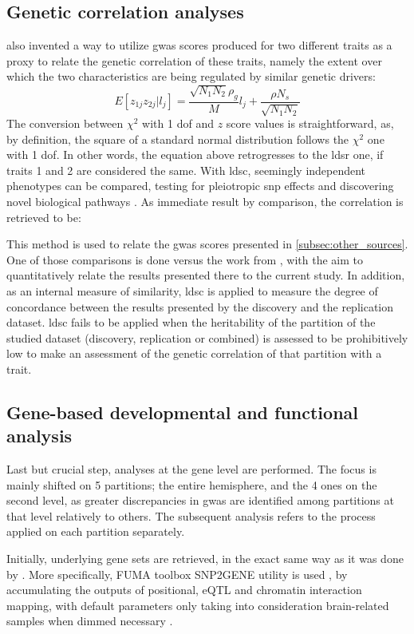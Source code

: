 \subsection{Genetic correlation analyses}
\label{subsec:ldsc}
\citet{Bulik-Sullivan2015_cor} also invented a way to utilize \ac{gwas} scores produced for two different traits as a proxy to relate the genetic correlation of these traits, namely the extent over which the two characteristics are being regulated by similar genetic drivers:
$$
E[z_{1j}z_{2j}|l_j] = \frac{\sqrt{N_1N_2}\rho_g}{M}l_j + \frac{\rho N_s}{\sqrt{N_1N_2}}
$$
The conversion between $\chi^2$ with 1 \ac{dof} and $z$ score values is straightforward, as, by definition, the square of a standard normal distribution follows the $\chi^2$ one with 1 \ac{dof}. In other words, the equation above retrogresses to the \ac{ldsr} one, if traits 1 and 2 are considered the same. With \ac{ldsc}, seemingly independent phenotypes can be compared, testing for pleiotropic \ac{snp} effects and discovering novel biological pathways \cite{Bulik-Sullivan2015_cor}. As immediate result by comparison, the correlation is retrieved to be:


This method is used to relate the \ac{gwas} scores presented in \autoref{subsec:other_sources}. One of those comparisons is done versus the work from \citet{Sha2021}, with the aim to quantitatively relate the results presented there to the current study. In addition, as an internal measure of similarity, \ac{ldsc} is applied to measure the degree of concordance between the results presented by the discovery and the replication dataset. \Ac{ldsc} fails to be applied when the heritability of the partition of the studied dataset (discovery, replication or combined) is assessed to be prohibitively low to make an assessment of the genetic correlation of that partition with a trait. 

\subsection{Gene-based developmental and functional analysis}
\label{subsec:func_mat_methods}
Last but crucial step, analyses at the gene level are performed. The focus is mainly shifted on 5 partitions; the entire hemisphere, and the 4 ones on the second level, as greater discrepancies in \ac{gwas} are identified among partitions at that level relatively to others. The subsequent analysis refers to the process applied on each partition separately.

Initially, underlying gene sets are retrieved, in the exact same way as it was done by \citet{Sha2021}. More specifically, FUMA toolbox SNP2GENE  utility is used \cite{Watanabe2017}, by accumulating the outputs of positional, eQTL and chromatin interaction mapping, with default parameters only taking into consideration brain-related samples when dimmed necessary \cite{Sha2021,Watanabe2017}. 


